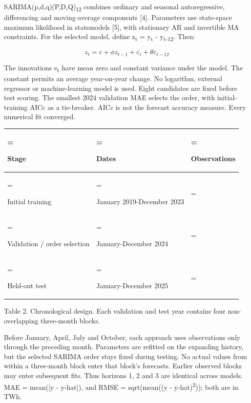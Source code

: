 \documentclass[11pt,a4paper]{article}
\begin{document}
SARIMA(p,d,q)(P,D,Q)\textsubscript{12} combines ordinary and seasonal autoregressive, differencing and moving-average components [4]. Parameters use state-space maximum likelihood in statsmodels [5], with stationary AR and invertible MA constraints. For the selected model, define z\textsubscript{t} = y\textsubscript{t} - y\textsubscript{t-12}. Then:\par

\[z_t=c+\phi z_{t-1}+\varepsilon_t+\theta\varepsilon_{t-12}\tag{2}\]

The innovations e\textsubscript{t} have mean zero and constant variance under the model. The constant permits an average year-on-year change. No logarithm, external regressor or machine-learning model is used. Eight candidates are fixed before test scoring. The smallest 2024 validation MAE selects the order, with initial-training AICc as a tie-breaker. AICc is not the forecast accuracy measure. Every numerical fit converged.\par

{\fontsize{9.2}{11.3}\selectfont\begin{tabularx}{\linewidth}{@{}>{\hsize=1.02000\hsize\linewidth=\hsize\raggedright\arraybackslash}X>{\hsize=1.41000\hsize\linewidth=\hsize\raggedright\arraybackslash}X>{\hsize=0.57000\hsize\linewidth=\hsize\raggedright\arraybackslash}X@{}}\toprule

\rowcolor[gray]{0.94}

Stage & Dates & Observations \\

\midrule

Initial training & January 2019-December 2023 & 60 \\

Validation / order selection & January-December 2024 & 12 \\

Held-out test & January-December 2025 & 12 \\

\bottomrule\end{tabularx}}\par

{\fontsize{9}{11.3}\selectfont Table 2. Chronological design. Each validation and test year contains four non-overlapping three-month blocks.\par}

Before January, April, July and October, each approach uses observations only through the preceding month. Parameters are refitted on the expanding history, but the selected SARIMA order stays fixed during testing. No actual values from within a three-month block enter that block's forecasts. Earlier observed blocks may enter subsequent fits. Thus horizons 1, 2 and 3 are identical across models. MAE = mean(|y - y-hat|), and RMSE = sqrt(mean((y - y-hat)\textsuperscript{2})); both are in TWh.\par
\end{document}

